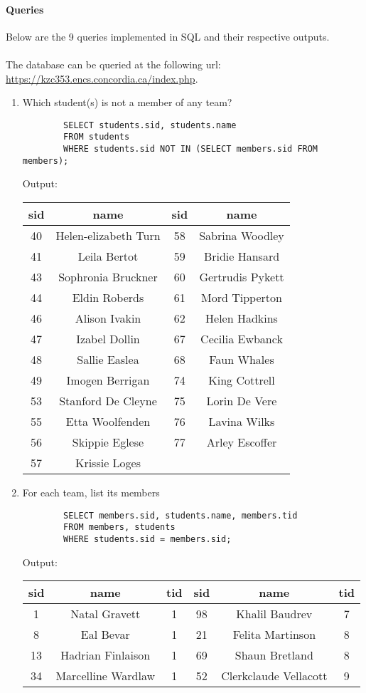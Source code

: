 \documentclass[11pt,letterpaper]{article}
\begin{document}
	
	\paragraph{Queries} Below are the 9 queries implemented in SQL and their respective outputs.\\
	\\
	The database can be queried at the following url: \url{https://kzc353.encs.concordia.ca/index.php}.
	\begin{enumerate}
		
		\item Which student(s) is not a member of any team?
		\begin{verbatim}
		SELECT students.sid, students.name
		FROM students
		WHERE students.sid NOT IN (SELECT members.sid FROM members);
		\end{verbatim}
		Output:
		\begin{center}
			\begin{tabular}{ | c  c | c  c | }
				\hline
				sid & name & sid & name\\
				\hline
				40 & Helen-elizabeth Turn & 58 & Sabrina Woodley \\
				41 & Leila Bertot & 59 & Bridie Hansard \\
				43 & Sophronia Bruckner & 60 & Gertrudis Pykett \\
				44 & Eldin Roberds & 61 & Mord Tipperton \\
				46 & Alison Ivakin & 62 & Helen Hadkins \\
				47 & Izabel Dollin & 67 & Cecilia Ewbanck \\
				48 & Sallie Easlea & 68 & Faun Whales \\
				49 & Imogen Berrigan & 74 & King Cottrell \\
				53 & Stanford De Cleyne & 75 & Lorin De Vere \\
				55 & Etta Woolfenden & 76 & Lavina Wilks \\
				56 & Skippie Eglese & 77 & Arley Escoffer \\
				57 & Krissie Loges &  & \\
				\hline
			\end{tabular}
		\end{center}
		
		\item For each team, list its members
		\begin{verbatim}
		SELECT members.sid, students.name, members.tid 
		FROM members, students 
		WHERE students.sid = members.sid;
		\end{verbatim}
		Output:
		\begin{center}
			\begin{tabular}{ | c  c  c |  c c c | }
				\hline
				sid & name & tid & sid & name & tid \\
				\hline
				1 & Natal Gravett & 1 & 98 & Khalil Baudrev & 7 \\
				8 & Eal Bevar & 1 & 21 & Felita Martinson & 8 \\
				13 & Hadrian Finlaison & 1 & 69 & Shaun Bretland & 8 \\
				34 & Marcelline Wardlaw & 1 & 52 & Clerkclaude Vellacott & 9 \\
				

\end{tabular}
\end{center}
\end{enumerate}
\end{document}

